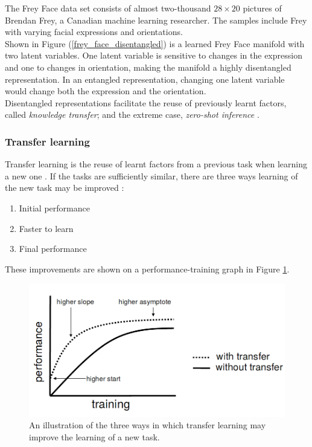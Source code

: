 \documentclass[12pt,twoside]{article}
\begin{document}
The Frey Face data set consists of almost two-thousand $28\times20$ pictures of Brendan Frey, a Canadian machine learning researcher. The samples include Frey with varying facial expressions and orientations.\\

Shown in Figure (\ref{frey_face_disentangled}) is a learned Frey Face manifold with two latent variables. One latent variable is sensitive to changes in the expression and one to changes in orientation, making the manifold a highly disentangled representation. In an entangled representation, changing one latent variable would change both the expression and the orientation.\\

Disentangled representations facilitate the reuse of previously learnt factors, called \textit{knowledge transfer}; and the extreme case, \textit{zero-shot inference} \cite{IanGoodfellowYoshuaBengio2015,Higgins2016}.

\subsubsection{Transfer learning}
Transfer learning is the reuse of learnt factors from a previous task when learning a new one \cite{IanGoodfellowYoshuaBengio2015}. If the tasks are sufficiently similar, there are three ways learning of the new task may be improved \cite{Torrey2009}:

\begin{enumerate}
\item Initial performance
\item Faster to learn
\item Final performance
\end{enumerate}

These improvements are shown on a performance-training graph in Figure \ref{transfer_learning_three_ways}.\\

\begin{figure}
\includegraphics[scale=0.3]{figures/torrey_2009_2.png}
\centering
\captionsetup{justification=centering}
\caption{An illustration of the three ways in which transfer learning may improve the learning of a new task. \cite{Torrey2009}}
\label{transfer_learning_three_ways}
\end{figure}
\end{document}
